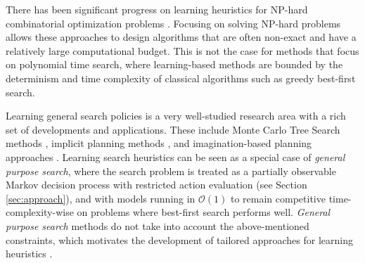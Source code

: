 There has been significant progress on learning heuristics for NP-hard combinatorial optimization problems \cite{NIPS2017_d9896106, NEURIPS2018_8d3bba74, NEURIPS2020_49f85a9e}. Focusing on solving NP-hard problems allows these approaches to design algorithms that are often non-exact and have a relatively large computational budget. This is not the case for methods that focus on polynomial time search, where learning-based methods are bounded by the determinism and time complexity of classical algorithms such as greedy best-first search.







Learning general search policies is a very well-studied research area with a rich set of developments and applications. These include Monte Carlo Tree Search methods \cite{silver2010monte, guez2018learning}, implicit planning methods \cite{deac2020xlvin, karkus2017qmdp, tamar2016value}, and imagination-based planning approaches \cite{pascanu2017learning, weber2017imagination}. Learning search heuristics can be seen as a special case of \textit{general purpose search}, where the search problem is treated as a partially observable Markov decision process with restricted action evaluation (see Section \ref{sec:approach}), and with models running in $\mathcal{O}(1)$ to remain competitive time-complexity-wise on problems where best-first search performs well. \textit{General purpose search} methods do not take into account the above-mentioned constraints, which motivates the development of tailored approaches for learning heuristics \cite{ bhardwaj2017learning, chen2020retro}.


